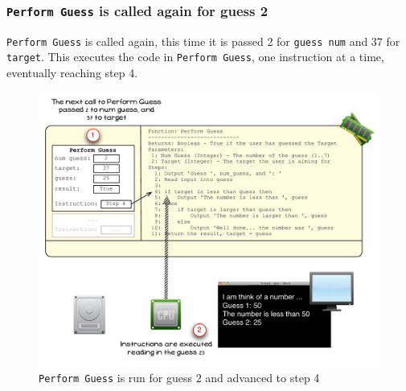 
\clearpage

\subsubsection{\texttt{Perform Guess} is called again for guess 2} %
\label{ssub:perform_guess_is_called_for_guess_2}

\texttt{Perform Guess} is called again, this time it is passed 2 for \texttt{guess num} and 37 for \texttt{target}. This executes the code in \texttt{Perform Guess}, one instruction at a time, eventually reaching step 4.

\begin{figure}[htbp]
   \centering
   \includegraphics[width=\textwidth]{./topics/control-flow/images/PerformGuess5} 
   \caption{\texttt{Perform Guess} is run for guess 2 and advanced to step 4}
   \label{fig:perform-guess-5}
\end{figure}

